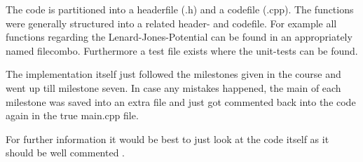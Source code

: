 The code is partitioned into a headerfile (.h) and a codefile (.cpp). The functions were generally structured into a related header- and codefile. For example all functions regarding the Lenard-Jones-Potential can be found in an appropriately named filecombo. Furthermore a test file exists where the unit-tests can be found.
\par
The implementation itself just followed the milestones given in the course and went up till milestone seven. 
In case any mistakes happened, the main of each milestone was saved into an extra file and just got commented back into the code again in the true main.cpp file. 
\par
For further information it would be best to just look at the code itself as it should be well commented \cite{molDymGithub}.




